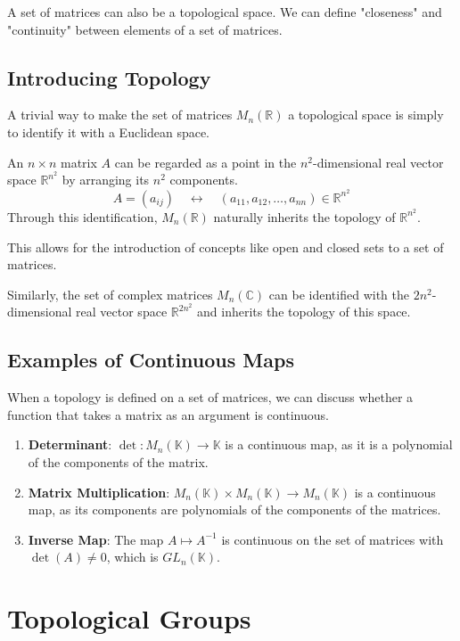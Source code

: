 \documentclass[uplatex,a4j,12pt,dvipdfmx]{jsarticle}
\begin{document}
A set of matrices can also be a topological space.
We can define "closeness" and "continuity" between elements of a set of matrices.

\subsection{\textbf{Introducing Topology}}

A trivial way to make the set of matrices $M_n(\mathbb{R})$ a topological space is simply to identify it with a Euclidean space.

An $n \times n$ matrix $A$ can be regarded as a point in the $n^2$-dimensional real vector space $\mathbb{R}^{n^2}$ by arranging its $n^2$ components.
$$ A = (a_{ij}) \quad \leftrightarrow \quad (a_{11}, a_{12}, \dots, a_{nn}) \in \mathbb{R}^{n^2} $$
Through this identification, $M_n(\mathbb{R})$ naturally inherits the topology of $\mathbb{R}^{n^2}$.

This allows for the introduction of concepts like open and closed sets to a set of matrices.


Similarly, the set of complex matrices $M_n(\mathbb{C})$ can be identified with the $2n^2$-dimensional real vector space $\mathbb{R}^{2n^2}$ and inherits the topology of this space.

\subsection{\textbf{Examples of Continuous Maps}}

When a topology is defined on a set of matrices, we can discuss whether a function that takes a matrix as an argument is continuous.

\begin{enumerate}
	\item \textbf{Determinant}: $\det : M_n(\mathbb{K}) \to \mathbb{K}$ is a continuous map, as it is a polynomial of the components of the matrix.
	\item \textbf{Matrix Multiplication}: $M_n(\mathbb{K}) \times M_n(\mathbb{K}) \to M_n(\mathbb{K})$ is a continuous map, as its components are polynomials of the components of the matrices.
	\item \textbf{Inverse Map}: The map $A \mapsto A^{-1}$ is continuous on the set of matrices with $\det(A) \neq 0$, which is $GL_n(\mathbb{K})$.
\end{enumerate}


\section{Topological Groups}
\end{document}
